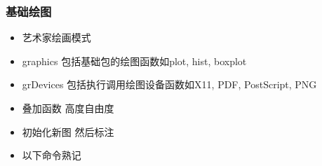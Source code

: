 \documentclass[]{book}
\providecommand{\tightlist}{%
  \setlength{\itemsep}{0pt}\setlength{\parskip}{0pt}}
\begin{document}
\hypertarget{ux57faux7840ux7ed8ux56fe}{%
\subsubsection{基础绘图}\label{ux57faux7840ux7ed8ux56fe}}

\begin{itemize}
\tightlist
\item
  艺术家绘画模式
\item
  graphics 包括基础包的绘图函数如plot, hist, boxplot
\item
  grDevices 包括执行调用绘图设备函数如X11, PDF, PostScript, PNG
\item
  叠加函数 高度自由度
\item
  初始化新图 然后标注
\item
  以下命令熟记


\end{itemize}
\end{document}
